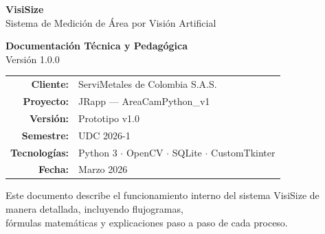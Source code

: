 \documentclass[12pt, a4paper]{article}
\begin{document}

\begin{titlepage}
  \centering
  \vspace*{1.5cm}

  {\Huge\bfseries\color{visiblu} VisiSize}\\[0.4cm]
  {\large\color{visigray} Sistema de Medición de Área por Visión Artificial}\\[1.5cm]


  \vspace{1.5cm}
  {\large\bfseries Documentación Técnica y Pedagógica}\\[0.5cm]
  {\normalsize Versión 1.0.0}\\[2cm]

  \begin{tabular}{rl}
    \textbf{Cliente:}    & ServiMetales de Colombia S.A.S. \\[0.3cm]
    \textbf{Proyecto:}   & JRapp --- AreaCamPython\_v1 \\[0.3cm]
    \textbf{Versión:}    & Prototipo v1.0 \\[0.3cm]
    \textbf{Semestre:}   & UDC 2026-1 \\[0.3cm]
    \textbf{Tecnologías:} & Python 3 $\cdot$ OpenCV $\cdot$ SQLite $\cdot$ CustomTkinter \\[0.3cm]
    \textbf{Fecha:}      & Marzo 2026 \\
  \end{tabular}

  \vfill
  {\small\color{gray} Este documento describe el funcionamiento interno
  del sistema VisiSize de manera detallada, incluyendo flujogramas,\\
  fórmulas matemáticas y explicaciones paso a paso de cada proceso.}
\end{titlepage}
\end{document}
